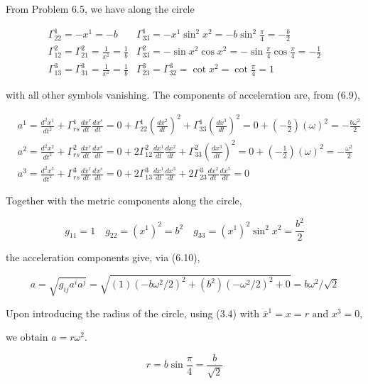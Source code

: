 \documentclass[10pt]{article}
\begin{document}
From Problem 6.5, we have along the circle

$$
\begin{array}{cc}
\Gamma_{22}^{1}=-x^{1}=-b & \Gamma_{33}^{1}=-x^{1} \sin ^{2} x^{2}=-b \sin ^{2} \frac{\pi}{4}=-\frac{b}{2} \\
\Gamma_{12}^{2}=\Gamma_{21}^{2}=\frac{1}{x^{1}}=\frac{1}{b} & \Gamma_{33}^{2}=-\sin x^{2} \cos x^{2}=-\sin \frac{\pi}{4} \cos \frac{\pi}{4}=-\frac{1}{2} \\
\Gamma_{13}^{3}=\Gamma_{31}^{3}=\frac{1}{x^{1}}=\frac{1}{b} & \Gamma_{23}^{3}=\Gamma_{32}^{3}=\cot x^{2}=\cot \frac{\pi}{4}=1
\end{array}
$$

with all other symbols vanishing. The components of acceleration are, from (6.9),

$$
\begin{aligned}
& a^{1}=\frac{d^{2} x^{1}}{d t^{2}}+\Gamma_{r s}^{1} \frac{d x^{r}}{d t} \frac{d x^{s}}{d t}=0+\Gamma_{22}^{1}\left(\frac{d x^{2}}{d t}\right)^{2}+\Gamma_{33}^{1}\left(\frac{d x^{3}}{d t}\right)^{2}=0+\left(-\frac{b}{2}\right)(\omega)^{2}=-\frac{b \omega^{2}}{2} \\
& a^{2}=\frac{d^{2} x^{2}}{d t^{2}}+\Gamma_{r s}^{2} \frac{d x^{r}}{d t} \frac{d x^{s}}{d t}=0+2 \Gamma_{12}^{2} \frac{d x^{1}}{d t} \frac{d x^{2}}{d t}+\Gamma_{33}^{2}\left(\frac{d x^{3}}{d t}\right)^{2}=0+\left(-\frac{1}{2}\right)(\omega)^{2}=-\frac{\omega^{2}}{2} \\
& a^{3}=\frac{d^{2} x^{3}}{d t^{2}}+\Gamma_{r s}^{3} \frac{d x^{r}}{d t} \frac{d x^{s}}{d t}=0+2 \Gamma_{13}^{3} \frac{d x^{1}}{d t} \frac{d x^{3}}{d t}+2 \Gamma_{23}^{3} \frac{d x^{2}}{d t} \frac{d x^{3}}{d t}=0
\end{aligned}
$$

Together with the metric components along the circle,

$$
g_{11}=1 \quad g_{22}=\left(x^{1}\right)^{2}=b^{2} \quad g_{33}=\left(x^{1}\right)^{2} \sin ^{2} x^{2}=\frac{b^{2}}{2}
$$

the acceleration components give, via (6.10),

$$
a=\sqrt{g_{i j} a^{i} a^{j}}=\sqrt{(1)\left(-b \omega^{2} / 2\right)^{2}+\left(b^{2}\right)\left(-\omega^{2} / 2\right)^{2}+0}=b \omega^{2} / \sqrt{2}
$$

Upon introducing the radius of the circle, using (3.4) with $\bar{x}^{1}=x=r$ and $x^{3}=0$,

we obtain $a=r \omega^{2}$.

$$
r=b \sin \frac{\pi}{4}=\frac{b}{\sqrt{2}}
$$
\end{document}
